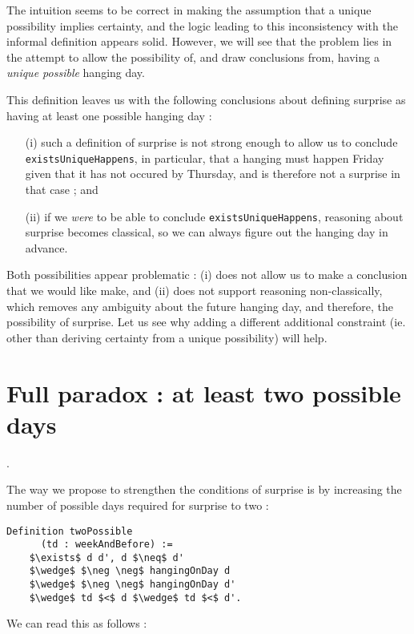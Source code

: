 \documentclass[journal]{journal}
\begin{document}
The intuition seems to be correct in making the assumption that a unique possibility
implies certainty, and the logic leading to this inconsistency with the informal
definition appears solid.
However, we will see that the problem lies in the attempt
to allow the possibility of, and draw conclusions from, having a \emph{unique possible }
hanging day.

This definition leaves us with the following conclusions about defining surprise as
having at least one possible hanging day :

\begin{itemize}
  \item[(i)] such a definition of surprise is not strong enough to allow us to conclude
  {\tt existsUniqueHappens}, in particular, that a hanging
  must happen Friday given that it has not occured by Thursday, and is
  therefore not a surprise in that case ; and \newline
  \item[(ii)] if we \emph{were} to be able to conclude {\tt existsUniqueHappens},
  reasoning about surprise
  becomes classical, so we can always figure out the hanging day in advance.
\end{itemize}

Both possibilities appear problematic : (i) does not allow us to make
a conclusion that we would like make,
and (ii) does not support reasoning non-classically, which removes any ambiguity
about the future hanging day, and therefore, the possibility of surprise.
Let us see why adding a different additional constraint (ie. other than deriving
certainty from a unique possibility) will help.

\section{Full paradox : at least two possible days}.
\label{sec:two}

The way we propose to strengthen the conditions of surprise is by increasing
the number of possible days required for surprise to two :

\begin{lstlisting}[mathescape=true]
  Definition twoPossible
      (td : weekAndBefore) :=
    $\exists$ d d', d $\neq$ d'
    $\wedge$ $\neg \neg$ hangingOnDay d
    $\wedge$ $\neg \neg$ hangingOnDay d'
    $\wedge$ td $<$ d $\wedge$ td $<$ d'.
\end{lstlisting}

We can read this as follows :
\end{document}
